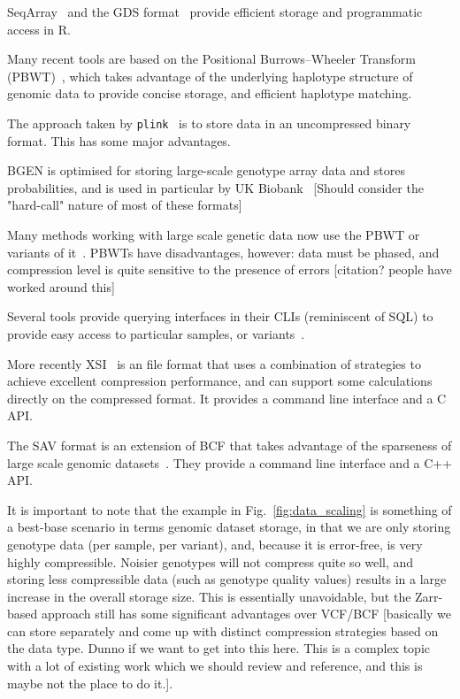 \documentclass[9pt,lineno]{elife}
\newcommand{\toolname}[1]{\texttt{#1}}
\begin{document}
SeqArray~\citep{zheng2017seqarray} and the GDS format~\citep{zheng2012high}
provide efficient storage and programmatic access in R.


Many recent tools are based on the Positional Burrows--Wheeler
Transform (PBWT)~\citep{durbin2014efficient}, which takes advantage
of the underlying haplotype structure of genomic data to provide
concise storage, and efficient haplotype matching.

The approach taken by \toolname{plink}~\citep{purcell2007plink,chang2015second} is to
store data in an uncompressed binary format. This has some major
advantages.

BGEN \citep{band2018bgen} is optimised for storing large-scale
genotype array data and stores probabilities, and is used
in particular by UK Biobank~\citep{bycroft2018genome}
[Should consider the "hard-call" nature of most of these formats]

Many methods working with large scale genetic
data now use the PBWT or variants of
it~\citep[e.g.][]{li2016bgt,lefaive2021sparse,wertenbroek2022xsi}. PBWTs have
disadvantages, however: data must be phased, and compression level
is quite sensitive to the presence of errors [citation? people have
worked around this]

Several tools provide querying interfaces in their CLIs
(reminiscent of SQL) to provide easy access to particular samples, or
variants~\cite{li2016bgt,layer2016efficient}.

More recently XSI~\citep{wertenbroek2022xsi} is an file format that
uses a combination of strategies to achieve excellent compression
performance, and can support some calculations directly on the
compressed format. It provides a command line interface and a
C API.

The SAV format is an extension of BCF that takes advantage
of the sparseness of large scale genomic datasets~\citep{lefaive2021sparse}.
They provide a command line interface and a C++ API.

It is important to note that the example in Fig.~\ref{fig:data_scaling}
is something of a best-base
scenario in terms genomic dataset storage, in that we are only
storing genotype data (per sample, per variant),
and, because it is error-free, is very
highly compressible. Noisier genotypes will not compress quite
so well, and storing less compressible data (such as genotype
quality values) results in a large increase in the overall
storage size. This is essentially unavoidable, but the Zarr-based
approach still has some significant advantages over VCF/BCF
[basically we can store separately and come up with distinct
compression strategies based on the data type. Dunno if we
want to get into this here. This is a complex topic with
a lot of existing work which we should review and reference,
and this is maybe not the place to do it.].
\end{document}
